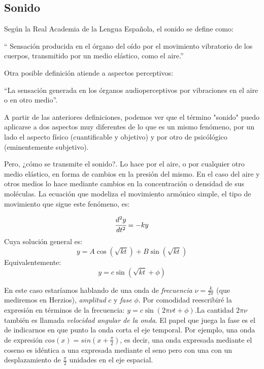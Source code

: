 \documentclass[11pt,a4paper]{article}
\begin{document}
	\subsection{Sonido}
	
	    Según la Real Academia de la Lengua Española, el sonido se define como:
	    
	    \begin{center} 
	    `` Sensación producida en el órgano del oído por el movimiento vibratorio de los cuerpos, transmitido por un medio elástico, como el aire.''
	    \end{center}
	    
		Otra posible definición atiende a aspectos perceptivos:

		\begin{center}
		``La sensación generada en los órganos audioperceptivos por vibraciones en el aire o en otro medio''\cite{Set}.
		\end{center}
		
		 A partir de las anteriores definiciones, podemos ver que el término "sonido" puedo aplicarse a dos aspectos muy diferentes de lo que es un mismo fenómeno, por un lado el aspecto físico (cuantificable y objetivo) y por otro de psicólógico (eminentemente subjetivo).
		 \vspace{3mm}

		Pero, ¿cómo se transmite el sonido?. Lo hace por el aire, o por cualquier otro medio elástico, en forma de cambios en la presión del mismo. En el caso del aire y otros medios lo hace mediante cambios en la concentración o densidad de sus moléculas. La ecuación que modeliza el movimiento armónico simple, el tipo de movimiento que sigue este fenómeno, es:
		
		$$ \cfrac{d^2y}{d t^2} = -ky $$ 
		Cuya solución general es:
		$$ y = A \cos(\sqrt{kt}) + B \sin(\sqrt{kt})$$
		Equivalentemente:
		$$ y = c \sin(\sqrt{kt} + \phi) $$
		
		En este caso estaríamos hablando de una onda de \emph{frecuencia} $\nu = \frac{k}{2\pi}$ (que mediremos en Herzios), \emph{amplitud} $c$ y \emph{fase} $\phi$. Por comodidad reescribiré la expresión en términos de la frecuencia: $ y = c \sin( 2 \pi \nu t + \phi ) $.La cantidad $2\pi\nu$ también es llamada \emph{velocidad angular de la onda}. El papel que juega la fase es el de indicarnos en que punto la onda corta el eje temporal. Por ejemplo, una onda de expresión $ cos(x) = sin(x + \frac{\pi}{2} )$, es decir, una onda expresada mediante el coseno es idéntica a una expresada mediante el seno pero con una con un desplazamiento de $\frac{\pi}{2}$ unidades en el eje espacial.
		
\end{document}
